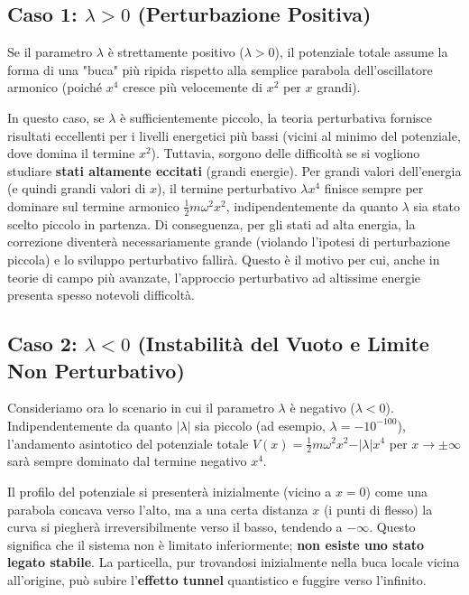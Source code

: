 \subsection{Caso 1: $\lambda > 0$ (Perturbazione Positiva)}
Se il parametro $\lambda$ è strettamente positivo ($\lambda > 0$), il potenziale totale assume la forma di una "buca" più ripida rispetto alla semplice parabola dell'oscillatore armonico (poiché $x^4$ cresce più velocemente di $x^2$ per $x$ grandi).

In questo caso, se $\lambda$ è sufficientemente piccolo, la teoria perturbativa fornisce risultati eccellenti per i livelli energetici più bassi (vicini al minimo del potenziale, dove domina il termine $x^2$).
Tuttavia, sorgono delle difficoltà se si vogliono studiare \textbf{stati altamente eccitati} (grandi energie). Per grandi valori dell'energia (e quindi grandi valori di $x$), il termine perturbativo $\lambda x^4$ finisce sempre per dominare sul termine armonico $\frac{1}{2} m \omega^2 x^2$, indipendentemente da quanto $\lambda$ sia stato scelto piccolo in partenza. Di conseguenza, per gli stati ad alta energia, la correzione diventerà necessariamente grande (violando l'ipotesi di perturbazione piccola) e lo sviluppo perturbativo fallirà. Questo è il motivo per cui, anche in teorie di campo più avanzate, l'approccio perturbativo ad altissime energie presenta spesso notevoli difficoltà.

\subsection{Caso 2: $\lambda < 0$ (Instabilità del Vuoto e Limite Non Perturbativo)}
Consideriamo ora lo scenario in cui il parametro $\lambda$ è negativo ($\lambda < 0$).
Indipendentemente da quanto $\vert{}\lambda\vert{}$ sia piccolo (ad esempio, $\lambda = -10^{-100}$), l'andamento asintotico del potenziale totale $V(x) = \frac{1}{2} m \omega^2 x^2 - \vert{}\lambda\vert{} x^4$ per $x \to \pm \infty$ sarà sempre dominato dal termine negativo $x^4$.

Il profilo del potenziale si presenterà inizialmente (vicino a $x=0$) come una parabola concava verso l'alto, ma a una certa distanza $x$ (i punti di flesso) la curva si piegherà irreversibilmente verso il basso, tendendo a $-\infty$.
Questo significa che il sistema non è limitato inferiormente; \textbf{non esiste uno stato legato stabile}. La particella, pur trovandosi inizialmente nella buca locale vicina all'origine, può subire l'\textbf{effetto tunnel} quantistico e fuggire verso l'infinito.


